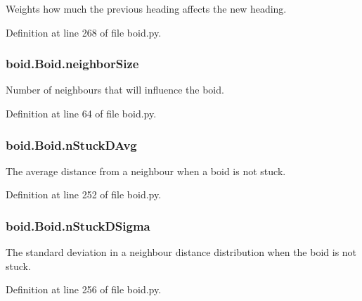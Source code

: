 Weights how much the previous heading affects the new heading. 



Definition at line 268 of file boid.\-py.

\hypertarget{classboid_1_1Boid_a4af115e678f7716a2eb87c573e71073c}{
\subsubsection[{neighbor\-Size}]{\setlength{\rightskip}{0pt plus 5cm}boid.\-Boid.\-neighbor\-Size}}\label{classboid_1_1Boid_a4af115e678f7716a2eb87c573e71073c}


Number of neighbours that will influence the boid. 



Definition at line 64 of file boid.\-py.

\hypertarget{classboid_1_1Boid_acdfca1dc9b177a512502c6af681bfa9e}{
\subsubsection[{n\-Stuck\-D\-Avg}]{\setlength{\rightskip}{0pt plus 5cm}boid.\-Boid.\-n\-Stuck\-D\-Avg}}\label{classboid_1_1Boid_acdfca1dc9b177a512502c6af681bfa9e}


The average distance from a neighbour when a boid is not stuck. 



Definition at line 252 of file boid.\-py.

\hypertarget{classboid_1_1Boid_add42a1be4f79d1ae8990065fa7e5d4de}{
\subsubsection[{n\-Stuck\-D\-Sigma}]{\setlength{\rightskip}{0pt plus 5cm}boid.\-Boid.\-n\-Stuck\-D\-Sigma}}\label{classboid_1_1Boid_add42a1be4f79d1ae8990065fa7e5d4de}


The standard deviation in a neighbour distance distribution when the boid is not stuck. 



Definition at line 256 of file boid.\-py.

